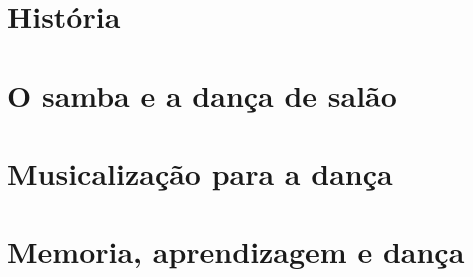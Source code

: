 \documentclass[12pt]{extbook} %
\begin{document}
\part{História}






\part{O samba e a dança de salão}




\part{Musicalização para a dança}





\part{Memoria, aprendizagem e dança}


\end{document}
